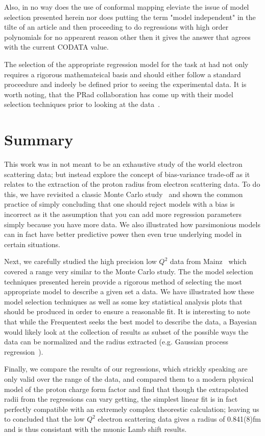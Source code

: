 \documentclass[10pt,aps,prc,twocolumn]{revtex4-1}
\begin{document}
Also, in no way does the use of conformal mapping eleviate the issue of model selection presented herein nor does
putting the term "model independent" in the tilte of an article and then proceeding to do regressions with high 
order polynomials for no appearent reason other then it gives the answer that agrees with the current CODATA value.

The selection of the appropriate regression model for the task at had not only requires a rigorous mathemateical basis
and should either follow a standard proceedure and indeely be defined prior to seeing the experimental data.
It is worth noting, that the PRad collaboration has come up with their model selection techniques
prior to looking at the data~\cite{Yan:2018bez}.


\section{Summary}

This work was in not meant to be an exhaustive study of the world electron scattering data; but 
instead explore the concept of bias-variance trade-off as it relates to the extraction of the proton 
radius from electron scattering data.
To do this, we have revisited a classic Monte Carlo study~\cite{Borkowski:1975ume} and shown
the common practice of simply concluding that one should reject models with a bias is incorrect
as it the assumption that you can add more regression parameters simply because you have more data.  
We also illustrated how parsimonious models can in fact have better 
predictive power then even true underlying model in certain situations. 

Next, we carefully studied the high precision low $Q^2$ data from Mainz~\cite{Bernauer:2010wm} which covered a range
very similar to the Monte Carlo study.  The the model selection techniques
presented herein provide a rigorous method of selecting the most appropriate model to describe a given
set a data.  We have illustrated how these model selection techniques as well as some key statistical 
analysis plots that should be produced in order to ensure a reasonable fit.   
It is interesting to note that while the Frequentest
seeks the best model to describe the data, a Bayesian would likely look at the collection of results as  
subset of the possible ways the data can be normalized and the radius extracted (e.g. Gaussian process 
regression~\cite{Rasmussen:2005}).    

Finally, we compare the results of our regressions, which strickly speaking are only valid over the
range of the data, and compared them to a modern physical model of the proton charge form factor
and find that though the extrapolated radii from the regressions can vary getting, the simplest
linear fit is in fact perfectly compatible with an extremely complex theorestic calculation; leaving
us to concluded that the low $Q^2$ electron scattering data gives a radius of 0.841(8)fm and is thus
consistant with the muonic Lamb shift results.
\end{document}

